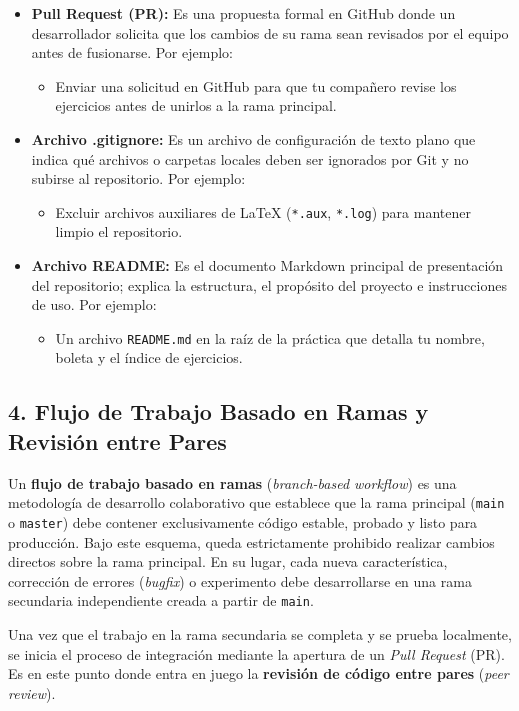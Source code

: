 \documentclass[12pt,letterpaper]{article}
\begin{document}
\begin{itemize}
    \item \textbf{Pull Request (PR):} Es una propuesta formal en GitHub donde un desarrollador solicita que los cambios de su rama sean revisados por el equipo antes de fusionarse. Por ejemplo:
    \begin{itemize}
        \item Enviar una solicitud en GitHub para que tu compañero revise los ejercicios antes de unirlos a la rama principal.
    \end{itemize}

    \item \textbf{Archivo .gitignore:} Es un archivo de configuración de texto plano que indica qué archivos o carpetas locales deben ser ignorados por Git y no subirse al repositorio. Por ejemplo:
    \begin{itemize}
        \item Excluir archivos auxiliares de LaTeX (\texttt{*.aux}, \texttt{*.log}) para mantener limpio el repositorio.
    \end{itemize}

    \item \textbf{Archivo README:} Es el documento Markdown principal de presentación del repositorio; explica la estructura, el propósito del proyecto e instrucciones de uso. Por ejemplo:
    \begin{itemize}
        \item Un archivo \texttt{README.md} en la raíz de la práctica que detalla tu nombre, boleta y el índice de ejercicios.
    \end{itemize}
\end{itemize}

\subsection*{4. Flujo de Trabajo Basado en Ramas y Revisión entre Pares}

Un \textbf{flujo de trabajo basado en ramas} (\textit{branch-based workflow}) es una metodología de desarrollo colaborativo que establece que la rama principal (\texttt{main} o \texttt{master}) debe contener exclusivamente código estable, probado y listo para producción. Bajo este esquema, queda estrictamente prohibido realizar cambios directos sobre la rama principal. En su lugar, cada nueva característica, corrección de errores (\textit{bugfix}) o experimento debe desarrollarse en una rama secundaria independiente creada a partir de \texttt{main}.

Una vez que el trabajo en la rama secundaria se completa y se prueba localmente, se inicia el proceso de integración mediante la apertura de un \textit{Pull Request} (PR). Es en este punto donde entra en juego la \textbf{revisión de código entre pares} (\textit{peer review}). 
\end{document}
